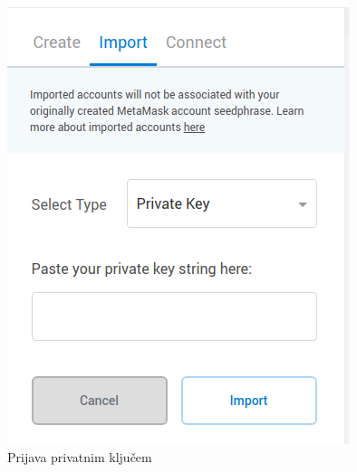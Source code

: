 \documentclass[times, utf8, zavrsni]{fer}
\begin{document}
\begin{figure}[ht]
  \centering
  \begin{minipage}[b]{0.4\textwidth}
    \includegraphics[width=\textwidth]{mmimportprivate.png}
    \caption{Prijava privatnim ključem}
  \end{minipage}
  \hfill
  \begin{minipage}[b]{0.4\textwidth}

\end{minipage}
\end{figure}
\end{document}
